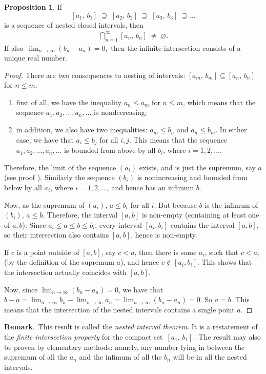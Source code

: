 \documentclass[12pt]{article}
\theoremstyle{definition}
\newtheorem{prop}{Proposition}
\begin{document}
\begin{prop} If 
$$[a_1,\,b_1] \;\supseteq\; [a_2,\,b_2] \;\supseteq\; [a_3,\,b_3] \;\supseteq\ldots$$
is a sequence of nested closed intervals, then 
\begin{align*}
\bigcap_{n=1}^\infty [a_n,\,b_n] \;\neq\; \varnothing.
\end{align*}
If also\, $\displaystyle\lim_{n\to\infty}(b_n\!-\!a_n) = 0$,\, then the infinite 
intersection consists of a unique real number.
\end{prop}

\begin{proof}  There are two consequences to nesting of intervals: $[a_m,\,b_m]\subseteq[a_n,\,b_n]$ for $n\le m$:
\begin{enumerate}
\item first of all, we have the inequality $a_n\le a_m$ for $n\le m$, which means that the sequence $a_1, a_2, \ldots, a_n, \ldots$ is nondecreasing;
\item in addition, we also have two inequalities: $a_m\le b_n$ and $a_n\le b_m$.  In either case, we have that $a_i\le b_j$ for all $i,j$.  This means that the sequence $a_1, a_2, \ldots, a_n, \ldots$ is bounded from above by all $b_i$, where $i=1,2,\ldots$.  
\end{enumerate}
Therefore, the limit of the sequence $(a_i)$ exists, and is just the supremum, say $a$ (see proof ).  Similarly the sequence $(b_i)$ is nonincreasing and bounded from below by all $a_i$, where $i=1,2,\ldots$, and hence has an infimum $b$.  

Now, as the supremum of $(a_i)$, $a\le b_i$ for all $i$.  But because $b$ is the infimum of $(b_i)$, $a\le b$.  Therefore, the interval $[a,b]$ is non-empty (containing at least one of $a,b$).  Since $a_i\le a\le b\le b_i$, every interval $[a_i,b_i]$ contains the interval $[a,b]$, so their intersection also contains $[a,b]$, hence is non-empty.

If $c$ is a point outside of $[a,b]$, say $c<a$, then there is some $a_i$, such that $c<a_i$ (by the definition of the supremum $a$), and hence $c\notin [a_i,b_i]$.  This shows that the intersection actually coincides with $[a,b]$.

Now, since $\displaystyle\lim_{n\to\infty}(b_n-a_n) = 0$, we have that $b-a=\displaystyle\lim_{n\to\infty}b_n - \displaystyle\lim_{n\to\infty} a_n = \displaystyle\lim_{n\to\infty}(b_n-a_n) = 0$.  So $a=b$.  This means that the intersection of the nested intervals contains a single point $a$.
\end{proof}

\textbf{Remark}.\, This result is called the \emph{nested interval theorem}.
It is a restatement of the \emph{finite intersection property}
for the compact set \,$[a_1,\,b_1]$.\, The result may also be proven by elementary methods:
namely, any number lying in between the supremum of all the $a_n$ and the infimum of all the $b_n$
will be in all the nested intervals.

\end{document}
